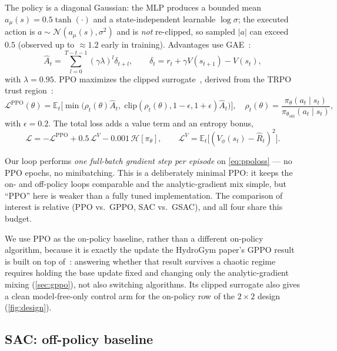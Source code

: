 The policy is a diagonal Gaussian: the MLP produces a bounded mean
$a_{\mu}(s)=0.5\tanh(\cdot)$ and a state-independent learnable
$\log\sigma$; the executed action is $a\sim\mathcal{N}(a_\mu(s),\sigma^2)$
and is \emph{not} re-clipped, so sampled $\lvert a\rvert$ can exceed
$0.5$ (observed up to $\approx 1.2$ early in training). Advantages use
GAE~\cite{gae2015}:
\begin{equation}
  \hat{A}_t=\sum_{l=0}^{T-t-1}(\gamma\lambda)^{l}\delta_{t+l},\qquad
  \delta_t=r_t+\gamma V(s_{t+1})-V(s_t),
  \label{eq:gae}
\end{equation}
with $\lambda=0.95$. PPO maximizes the clipped
surrogate~\cite{ppo2017}, derived from the TRPO trust
region~\cite{trpo2015}:
\begin{equation}
  \mathcal{L}^{\mathrm{PPO}}(\theta)=\mathbb{E}_t\!\Big[\min\!\big(\rho_t(\theta)\hat{A}_t,\;
  \mathrm{clip}(\rho_t(\theta),1-\epsilon,1+\epsilon)\hat{A}_t\big)\Big],\quad
  \rho_t(\theta)=\frac{\pi_\theta(a_t\mid s_t)}{\pi_{\theta_{\text{old}}}(a_t\mid s_t)},
  \label{eq:ppo}
\end{equation}
with $\epsilon=0.2$. The total loss adds a value term and an entropy bonus,
\begin{equation}
  \mathcal{L}=-\mathcal{L}^{\mathrm{PPO}}+0.5\,\mathcal{L}^{V}-0.001\,\mathcal{H}[\pi_\theta],
  \qquad \mathcal{L}^{V}=\mathbb{E}_t\big[(V_\phi(s_t)-\hat{R}_t)^2\big].
  \label{eq:ppoloss}
\end{equation}

Our loop performs \emph{one
full-batch gradient step per episode} on \cref{eq:ppoloss} --- no PPO
epochs, no minibatching. This is a deliberately minimal PPO: it keeps the
on- and off-policy loops comparable and the analytic-gradient mix simple,
but ``PPO'' here is weaker than a fully tuned implementation. The comparison
of interest is relative (PPO vs.\ GPPO, SAC vs.\ GSAC), and all four share
this budget.

We use PPO as the on-policy baseline, rather than a
different on-policy algorithm, because it is exactly the update the
HydroGym paper's GPPO result is built on top of~\cite{hydrogym2026}:
answering whether that result survives a chaotic regime requires holding
the base update fixed and changing only the analytic-gradient mixing
(\cref{sec:gppo}), not also switching algorithms. Its clipped surrogate also
gives a clean model-free-only control arm for the on-policy row of the
$2\times 2$ design (\cref{fig:design}).

\subsection{SAC: off-policy baseline}
\label{sec:sac}

